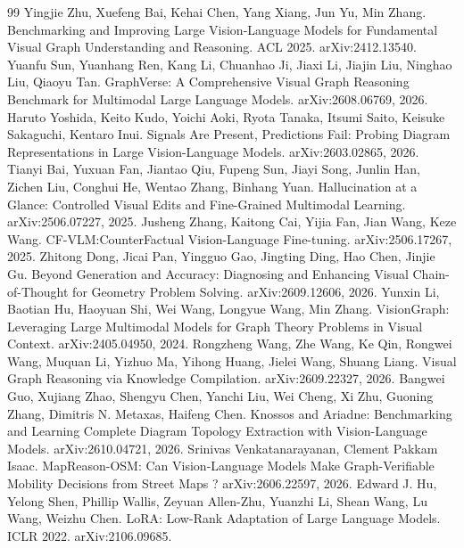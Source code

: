 \documentclass[11pt]{article}
\begin{document}
\begin{thebibliography}{99}
 Yingjie Zhu, Xuefeng Bai, Kehai Chen, Yang Xiang, Jun Yu, Min Zhang.
Benchmarking and Improving Large Vision-Language Models for Fundamental Visual Graph
Understanding and Reasoning. ACL 2025. arXiv:2412.13540.
 Yuanfu Sun, Yuanhang Ren, Kang Li, Chuanhao Ji, Jiaxi Li, Jiajin Liu,
Ninghao Liu, Qiaoyu Tan. GraphVerse: A Comprehensive Visual Graph Reasoning Benchmark for
Multimodal Large Language Models. arXiv:2608.06769, 2026.
 Haruto Yoshida, Keito Kudo, Yoichi Aoki, Ryota Tanaka, Itsumi Saito,
Keisuke Sakaguchi, Kentaro Inui. Signals Are Present, Predictions Fail: Probing Diagram
Representations in Large Vision-Language Models. arXiv:2603.02865, 2026.
 Tianyi Bai, Yuxuan Fan, Jiantao Qiu, Fupeng Sun, Jiayi Song, Junlin Han,
Zichen Liu, Conghui He, Wentao Zhang, Binhang Yuan. Hallucination at a Glance: Controlled
Visual Edits and Fine-Grained Multimodal Learning. arXiv:2506.07227, 2025.
 Jusheng Zhang, Kaitong Cai, Yijia Fan, Jian Wang, Keze Wang.
CF-VLM:CounterFactual Vision-Language Fine-tuning. arXiv:2506.17267, 2025.
 Zhitong Dong, Jicai Pan, Yingguo Gao, Jingting Ding, Hao Chen, Jinjie Gu.
Beyond Generation and Accuracy: Diagnosing and Enhancing Visual Chain-of-Thought for
Geometry Problem Solving. arXiv:2609.12606, 2026.
 Yunxin Li, Baotian Hu, Haoyuan Shi, Wei Wang, Longyue Wang, Min Zhang.
VisionGraph: Leveraging Large Multimodal Models for Graph Theory Problems in Visual Context.
arXiv:2405.04950, 2024.
 Rongzheng Wang, Zhe Wang, Ke Qin, Rongwei Wang, Muquan Li, Yizhuo Ma,
Yihong Huang, Jielei Wang, Shuang Liang. Visual Graph Reasoning via Knowledge Compilation.
arXiv:2609.22327, 2026.
 Bangwei Guo, Xujiang Zhao, Shengyu Chen, Yanchi Liu, Wei Cheng, Xi Zhu,
Guoning Zhang, Dimitris N. Metaxas, Haifeng Chen. Knossos and Ariadne: Benchmarking and
Learning Complete Diagram Topology Extraction with Vision-Language Models. arXiv:2610.04721, 2026.
 Srinivas Venkatanarayanan, Clement Pakkam Isaac. MapReason-OSM: Can
Vision-Language Models Make Graph-Verifiable Mobility Decisions from Street Maps ? arXiv:2606.22597, 2026.
 Edward J. Hu, Yelong Shen, Phillip Wallis, Zeyuan Allen-Zhu, Yuanzhi Li,
Shean Wang, Lu Wang, Weizhu Chen. LoRA: Low-Rank Adaptation of Large Language Models.
ICLR 2022. arXiv:2106.09685.
\end{thebibliography}
\end{document}

